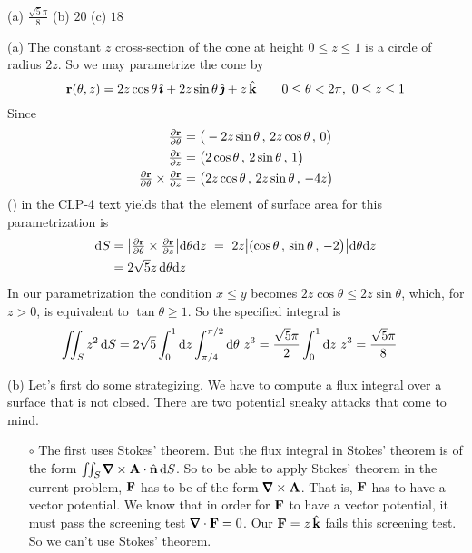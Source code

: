 \begin{answer} 
(a) $\frac{\sqrt{5}\pi}{8}$ \qquad
(b) $20$ \qquad
(c) $18$
\end{answer}

\begin{solution} (a) The constant $z$ cross-section of the cone at height
$0\le z\le 1$ is a circle of radius $2z$. So we may parametrize the
cone by
\begin{equation*}
\mathbf{r}(\theta,z) = 2z\cos\theta\,\hat{\pmb{\imath}} + 2z\sin\theta\,\hat{\pmb{\jmath}} +z\,\hat{\mathbf{k}}
\qquad 0\le\theta< 2\pi,\ 0\le z\le 1
\end{equation*}
Since
\begin{align*}
\tfrac{\partial\mathbf{r}}{\partial\theta}
&=\big(-2z\sin\theta\,,\,
        2z\cos\theta\,,\,
          0 \big) \\
\tfrac{\partial\mathbf{r}}{\partial z}
&=\big(2\cos\theta\,,\,
       2\sin\theta\,,\,
          1 \big) \\
\tfrac{\partial\mathbf{r}}{\partial\theta} \times \tfrac{\partial\mathbf{r}}{\partial z} 
&=\big(2z\cos\theta\,,\,
       2z\sin\theta\,,\,
       -4z\big)
\end{align*}
() in the CLP-4 text yields that
the element of surface area for this parametrization is
\begin{align*}
\mathrm{d}S &= 
\big|\tfrac{\partial\mathbf{r}}{\partial\theta}\times
      \tfrac{\partial\mathbf{r}}{\partial z} \big|\mathrm{d}\theta\mathrm{d}z
\ =\ 2z\big|(\cos\theta\,,\,\sin\theta\,,\,-2\big)\big|
    \mathrm{d}\theta\mathrm{d}z \\ 
&=2\sqrt{5}z\,\mathrm{d}\theta\mathrm{d}z
\end{align*}
In our parametrization the condition $x\le y$ becomes
$2z\cos\theta\le 2z\sin\theta$, which, for $z> 0$, is equivalent
to $\tan\theta\ge 1$.
So the specified integral is
\begin{align*}
\iint_S z^2\,\mathrm{d}S
&=2\sqrt{5}\int_0^1\mathrm{d}z\int_{\pi/4}^{\pi/2}\mathrm{d}\theta\ z^3
=\frac{\sqrt{5}\pi}{2}\int_0^1\mathrm{d}z\ z^3
=\frac{\sqrt{5}\pi}{8}
\end{align*}

\noindent (b) Let's first do some strategizing. We have to compute a flux integral over a surface that is not closed. There are two potential sneaky
attacks that come to mind.
\begin{itemize}\itemsep1pt \parskip0pt  %
\item[$\circ$] The first uses Stokes' theorem. But the flux integral 
in Stokes' theorem  is of the form 
$\dblInt_S \vnabla\times\vA\cdot\hn\,\dee{S}$. So to be able to apply
Stokes' theorem in the current problem, $\mathbf{F}$ has to be of the form
$\vnabla\times\vA$. That is, $\mathbf{F}$ has to have a vector potential.
We know that in order for $\mathbf{F}$ to have a vector potential, it must 
pass the screening test $\vnabla\cdot\vF=0$. Our $\mathbf{F}=z\,\hat{\mathbf{k}}$ fails
this screening test. So we can't use Stokes' theorem.


\end{itemize}
\end{solution}
